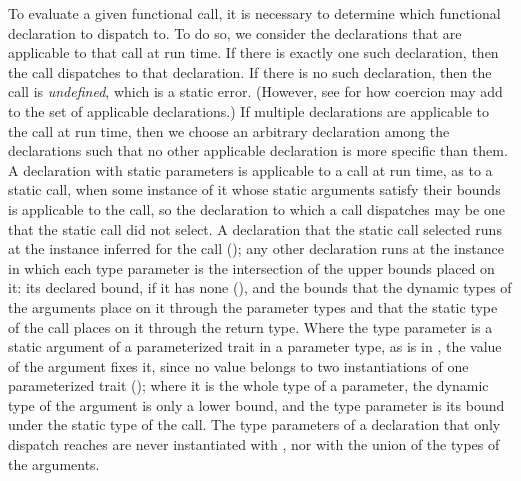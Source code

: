 To evaluate a given functional call,
it is necessary to determine which functional declaration
to dispatch to.
To do so,
we consider the declarations that are applicable to that call at run time.
If there is exactly one such declaration,
then the call dispatches to that declaration.
If there is no such declaration,
then the call is \emph{undefined}, which is a static error.
(However, see 
for how coercion may add to the set of applicable declarations.)
If multiple declarations are applicable to the call at run time,
then we choose an arbitrary declaration among the declarations such that
no other applicable declaration is more specific than them.
A declaration with static parameters is applicable to a call at run time, as
to a static call, when some instance of it whose static arguments satisfy
their bounds is applicable to the call, so the declaration to which a call
dispatches may be one that the static call did not select.
A declaration that the static call selected runs at the instance inferred for
the call (); any other declaration runs at the
instance in which each type parameter is the intersection of the upper bounds
placed on it: its declared bound,  if it has none
(), and the bounds that the dynamic types of the arguments
place on it through the parameter types and that the static type of the call
places on it through the return type.
Where the type parameter is a static argument of a parameterized trait in a
parameter type, as  is in ,
the value of the argument fixes it, since no value belongs to two
instantiations of one parameterized trait (); where it is
the whole type of a parameter, the dynamic type of the argument is only a
lower bound, and the type parameter is its bound under the static type of the
call.
The type parameters of a declaration that only dispatch reaches are never
instantiated with , nor with the union of the types of the
arguments.



